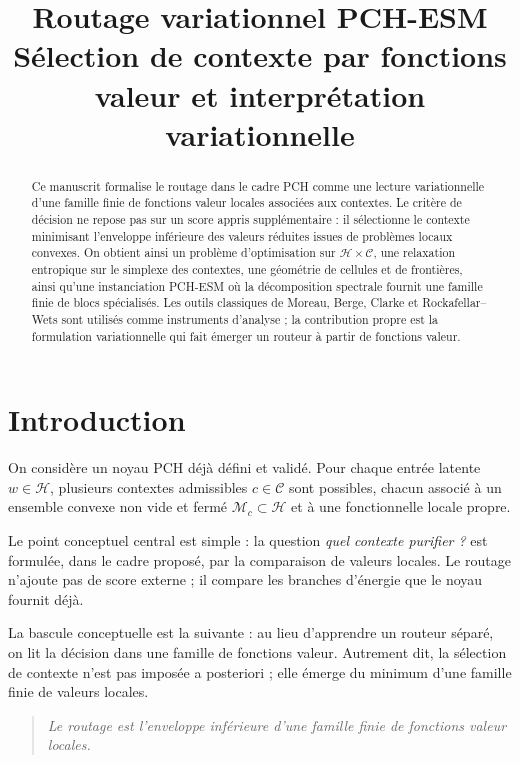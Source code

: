 \documentclass[11pt,a4paper]{article}
\title{Routage variationnel PCH-ESM\\
\large Sélection de contexte par fonctions valeur et interprétation variationnelle}
\author{}
\date{}
\newcommand{\Hh}{\mathcal H}
\newcommand{\Mcal}{\mathcal M}
\newcommand{\Ccal}{\mathcal C}
\begin{document}
\maketitle

\begin{abstract}
Ce manuscrit formalise le routage dans le cadre PCH comme une lecture variationnelle d'une famille finie de fonctions valeur locales associées aux contextes. Le critère de décision ne repose pas sur un score appris supplémentaire : il sélectionne le contexte minimisant l'enveloppe inférieure des valeurs réduites issues de problèmes locaux convexes. On obtient ainsi un problème d'optimisation sur \(\Hh\times\Ccal\), une relaxation entropique sur le simplexe des contextes, une géométrie de cellules et de frontières, ainsi qu'une instanciation PCH-ESM où la décomposition spectrale fournit une famille finie de blocs spécialisés. Les outils classiques de Moreau, Berge, Clarke et Rockafellar--Wets sont utilisés comme instruments d'analyse ; la contribution propre est la formulation variationnelle qui fait émerger un routeur à partir de fonctions valeur.
\end{abstract}

\tableofcontents

\section{Introduction}

On considère un noyau PCH déjà défini et validé. Pour chaque entrée latente \(w\in\Hh\), plusieurs contextes admissibles \(c\in\Ccal\) sont possibles, chacun associé à un ensemble convexe non vide et fermé \(\Mcal_c\subset\Hh\) et à une fonctionnelle locale propre.

Le point conceptuel central est simple : la question \emph{quel contexte purifier ?} est formulée, dans le cadre proposé, par la comparaison de valeurs locales. Le routage n'ajoute pas de score externe ; il compare les branches d'énergie que le noyau fournit déjà.

La bascule conceptuelle est la suivante : au lieu d'apprendre un routeur séparé, on lit la décision dans une famille de fonctions valeur. Autrement dit, la sélection de contexte n'est pas imposée a posteriori ; elle émerge du minimum d'une famille finie de valeurs locales.

\begin{quote}
\emph{Le routage est l'enveloppe inférieure d'une famille finie de fonctions valeur locales.}
\end{quote}
\end{document}
